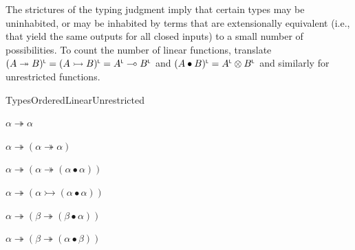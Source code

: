  
 
The strictures of the typing judgment imply that certain types may be uninhabited, or may be inhabited by terms that are extensionally equivalent (i.e., that yield the same outputs for all closed inputs) to a small number of possibilities. To count the number of linear functions, translate $(A\twoheadrightarrow B)^{\mathchoice{\mathsf{L}}{\mathsf{L}}{\scriptscriptstyle\mathsf{L}}{\scriptscriptstyle\mathsf{L}}}=(A\rightarrowtail
B)^{\mathchoice{\mathsf{L}}{\mathsf{L}}{\scriptscriptstyle\mathsf{L}}{\scriptscriptstyle\mathsf{L}}}=A^{\mathchoice{\mathsf{L}}{\mathsf{L}}{\scriptscriptstyle\mathsf{L}}{\scriptscriptstyle\mathsf{L}}}\multimap B^{\mathchoice{\mathsf{L}}{\mathsf{L}}{\scriptscriptstyle\mathsf{L}}{\scriptscriptstyle\mathsf{L}}}$ and $(A\bullet B)^{\mathchoice{\mathsf{L}}{\mathsf{L}}{\scriptscriptstyle\mathsf{L}}{\scriptscriptstyle\mathsf{L}}}=A^{\mathchoice{\mathsf{L}}{\mathsf{L}}{\scriptscriptstyle\mathsf{L}}{\scriptscriptstyle\mathsf{L}}}\otimes B^{\mathchoice{\mathsf{L}}{\mathsf{L}}{\scriptscriptstyle\mathsf{L}}{\scriptscriptstyle\mathsf{L}}}$ and similarly for unrestricted functions.\par
   
\par  Types\quad  Ordered\quad  Linear\quad  Unrestricted\quad  
   
\par  $\alpha\twoheadrightarrow\alpha$\quad  
 
\par  $\alpha\twoheadrightarrow(\alpha\twoheadrightarrow\alpha)$\quad  
 
\par  $\alpha\twoheadrightarrow(\alpha\twoheadrightarrow(\alpha\bullet\alpha))$\quad  
 
\par  $\alpha\twoheadrightarrow(\alpha\rightarrowtail(\alpha\bullet\alpha))$\quad  
 
\par  $\alpha\twoheadrightarrow(\beta\twoheadrightarrow(\beta\bullet\alpha))$\quad  
 
\par  $\alpha\twoheadrightarrow(\beta\twoheadrightarrow(\alpha\bullet\beta))$\quad  
   
 
